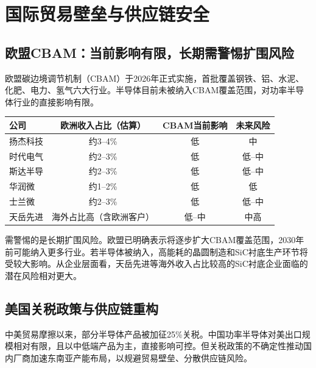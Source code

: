 \section{国际贸易壁垒与供应链安全}

\subsection{欧盟CBAM：当前影响有限，长期需警惕扩围风险}

欧盟碳边境调节机制（CBAM）于2026年正式实施，首批覆盖钢铁、铝、水泥、化肥、电力、氢气六大行业。半导体目前未被纳入CBAM覆盖范围，对功率半导体行业的直接影响有限。

\begin{exhibitbox}[表 8-6：主要功率半导体企业欧洲业务占比与CBAM影响]
\centering
\small
\begin{tabularx}{\textwidth}{X c c c}
\toprule
\textbf{公司} & \textbf{欧洲收入占比（估算）} & \textbf{CBAM当前影响} & \textbf{未来风险} \\
\midrule
扬杰科技 & 约3--4\% & \textcolor{riskgreen}{低} & \textcolor{riskamber}{中} \\
时代电气 & 约2--3\% & \textcolor{riskgreen}{低} & \textcolor{riskgreen}{低--中} \\
斯达半导 & 约2--3\% & \textcolor{riskgreen}{低} & \textcolor{riskgreen}{低--中} \\
华润微 & 约1--2\% & \textcolor{riskgreen}{低} & \textcolor{riskgreen}{低} \\
士兰微 & 约2--3\% & \textcolor{riskgreen}{低} & \textcolor{riskgreen}{低--中} \\
天岳先进 & 海外占比高（含欧洲客户） & \textcolor{riskgreen}{低--中} & \textcolor{riskamber}{中高} \\
\bottomrule
\end{tabularx}
\end{exhibitbox}

需警惕的是长期扩围风险。欧盟已明确表示将逐步扩大CBAM覆盖范围，2030年前可能纳入更多行业。若半导体被纳入，高能耗的晶圆制造和SiC衬底生产环节将受较大影响。从企业层面看，天岳先进等海外收入占比较高的SiC衬底企业面临的潜在风险相对更大。

\subsection{美国关税政策与供应链重构}

中美贸易摩擦以来，部分半导体产品被加征25\%关税。中国功率半导体对美出口规模相对有限，且以中低端产品为主，直接影响可控。但关税政策的不确定性推动国内厂商加速东南亚产能布局，以规避贸易壁垒、分散供应链风险。

